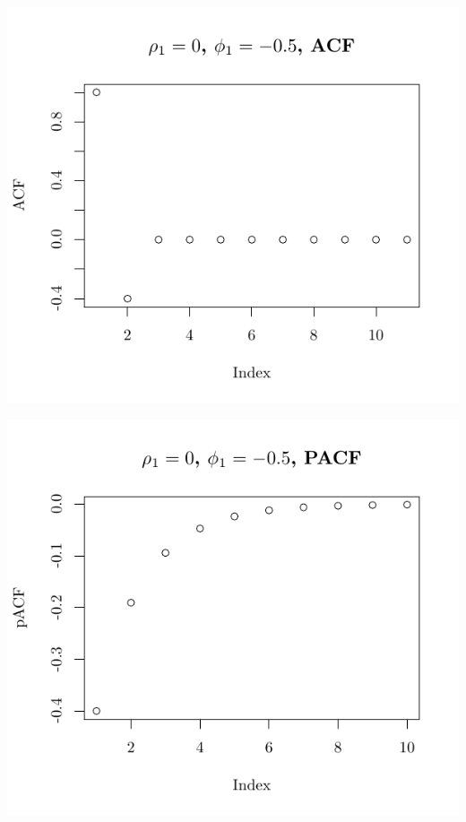 \documentclass[10pt]{paper}\usepackage[]{graphicx}\usepackage[]{color}
\makeatletter
\def\maxwidth{ %
  \ifdim\Gin@nat@width>\linewidth
    \linewidth
  \else
    \Gin@nat@width
  \fi
}
\newenvironment{knitrout}{}{} %
\makeatother
\begin{document}
\begin{knitrout}
{\centering \includegraphics[width=\maxwidth]{figure/graphics-plotter-21} 

}




{\centering \includegraphics[width=\maxwidth]{figure/graphics-plotter-22} 

}





\end{knitrout}
\end{document}
